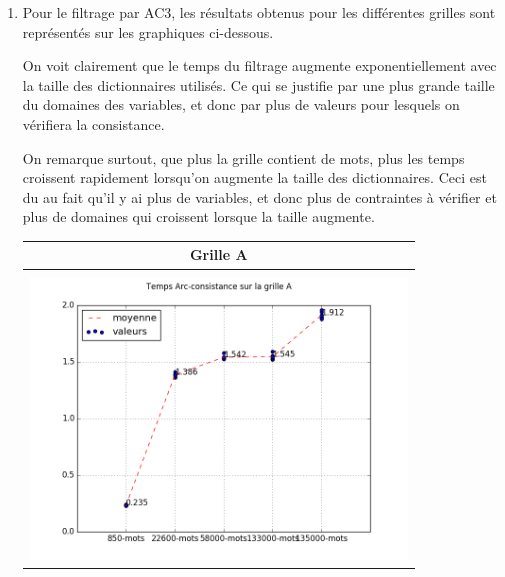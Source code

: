 \documentclass[a4paper,12pt]{report}
\begin{document}
\begin{enumerate}


\item Pour le filtrage par AC3, les résultats obtenus pour les différentes grilles sont représentés sur les graphiques ci-dessous.

On voit clairement que le temps du filtrage augmente exponentiellement avec la taille des dictionnaires utilisés. Ce qui se justifie par une plus grande taille du domaines des variables, et donc par plus de valeurs pour lesquels on vérifiera la consistance.

On remarque surtout, que plus la grille contient de mots, plus les temps croissent rapidement lorsqu'on augmente la taille des dictionnaires. Ceci est du au fait qu'il y ai plus de variables, et donc plus de contraintes à vérifier et plus de domaines qui croissent lorsque la taille augmente.\\

\begin{table}[!h]
\begin{center}
\begin{tabular}{|c|}

\hline
  Grille A\\
\hline   
   \\
\includegraphics[width=10cm]{AC3_A.png}  \\
\hline

\end{tabular}
\end{center}
\end{table}


\end{enumerate}
\end{document}
